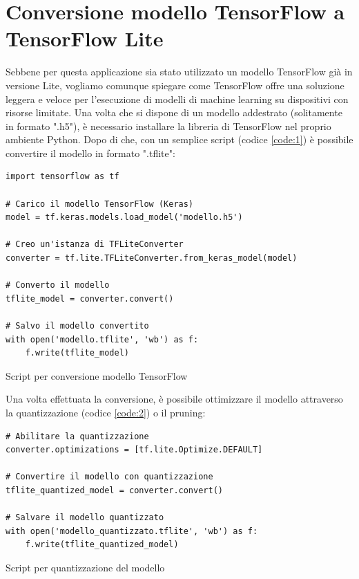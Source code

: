 \section{Conversione modello TensorFlow a TensorFlow Lite}
Sebbene per questa applicazione sia stato utilizzato un modello TensorFlow già in versione Lite, vogliamo comunque spiegare come TensorFlow offre una
soluzione leggera e veloce per l'esecuzione di modelli di machine learning su dispositivi con risorse limitate. Una volta che si dispone di un modello
addestrato (solitamente in formato ".h5"), è necessario installare la libreria di TensorFlow nel proprio ambiente Python. Dopo di che, con un semplice 
script (codice \ref{code:1}) è possibile convertire il modello in formato ".tflite":

\begin{code}
\begin{verbatim}
import tensorflow as tf
    
# Carico il modello TensorFlow (Keras)
model = tf.keras.models.load_model('modello.h5')

# Creo un'istanza di TFLiteConverter
converter = tf.lite.TFLiteConverter.from_keras_model(model)

# Converto il modello
tflite_model = converter.convert()

# Salvo il modello convertito
with open('modello.tflite', 'wb') as f:
    f.write(tflite_model)
\end{verbatim}
\caption{Script per conversione modello TensorFlow}
\label{code:1}
\end{code}
\bigskip

Una volta effettuata la conversione, è possibile ottimizzare il modello attraverso la quantizzazione (codice \ref{code:2}) o il pruning:

\begin{code}
\begin{verbatim}
# Abilitare la quantizzazione
converter.optimizations = [tf.lite.Optimize.DEFAULT]

# Convertire il modello con quantizzazione
tflite_quantized_model = converter.convert()

# Salvare il modello quantizzato
with open('modello_quantizzato.tflite', 'wb') as f:
    f.write(tflite_quantized_model)
\end{verbatim}
\caption{Script per quantizzazione del modello}
\label{code:2}
\end{code}

